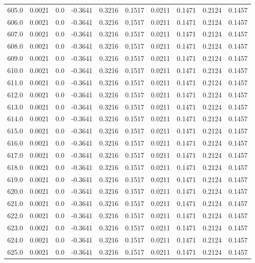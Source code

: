 \begin{longtable}{lrrrrrrrrr}
605.0 & 0.0021 & 0.0 & -0.3641 & 0.3216 & 0.1517 & 0.0211 & 0.1471 & 0.2124 & 0.1457 \\
606.0 & 0.0021 & 0.0 & -0.3641 & 0.3216 & 0.1517 & 0.0211 & 0.1471 & 0.2124 & 0.1457 \\
607.0 & 0.0021 & 0.0 & -0.3641 & 0.3216 & 0.1517 & 0.0211 & 0.1471 & 0.2124 & 0.1457 \\
608.0 & 0.0021 & 0.0 & -0.3641 & 0.3216 & 0.1517 & 0.0211 & 0.1471 & 0.2124 & 0.1457 \\
609.0 & 0.0021 & 0.0 & -0.3641 & 0.3216 & 0.1517 & 0.0211 & 0.1471 & 0.2124 & 0.1457 \\
610.0 & 0.0021 & 0.0 & -0.3641 & 0.3216 & 0.1517 & 0.0211 & 0.1471 & 0.2124 & 0.1457 \\
611.0 & 0.0021 & 0.0 & -0.3641 & 0.3216 & 0.1517 & 0.0211 & 0.1471 & 0.2124 & 0.1457 \\
612.0 & 0.0021 & 0.0 & -0.3641 & 0.3216 & 0.1517 & 0.0211 & 0.1471 & 0.2124 & 0.1457 \\
613.0 & 0.0021 & 0.0 & -0.3641 & 0.3216 & 0.1517 & 0.0211 & 0.1471 & 0.2124 & 0.1457 \\
614.0 & 0.0021 & 0.0 & -0.3641 & 0.3216 & 0.1517 & 0.0211 & 0.1471 & 0.2124 & 0.1457 \\
615.0 & 0.0021 & 0.0 & -0.3641 & 0.3216 & 0.1517 & 0.0211 & 0.1471 & 0.2124 & 0.1457 \\
616.0 & 0.0021 & 0.0 & -0.3641 & 0.3216 & 0.1517 & 0.0211 & 0.1471 & 0.2124 & 0.1457 \\
617.0 & 0.0021 & 0.0 & -0.3641 & 0.3216 & 0.1517 & 0.0211 & 0.1471 & 0.2124 & 0.1457 \\
618.0 & 0.0021 & 0.0 & -0.3641 & 0.3216 & 0.1517 & 0.0211 & 0.1471 & 0.2124 & 0.1457 \\
619.0 & 0.0021 & 0.0 & -0.3641 & 0.3216 & 0.1517 & 0.0211 & 0.1471 & 0.2124 & 0.1457 \\
620.0 & 0.0021 & 0.0 & -0.3641 & 0.3216 & 0.1517 & 0.0211 & 0.1471 & 0.2124 & 0.1457 \\
621.0 & 0.0021 & 0.0 & -0.3641 & 0.3216 & 0.1517 & 0.0211 & 0.1471 & 0.2124 & 0.1457 \\
622.0 & 0.0021 & 0.0 & -0.3641 & 0.3216 & 0.1517 & 0.0211 & 0.1471 & 0.2124 & 0.1457 \\
623.0 & 0.0021 & 0.0 & -0.3641 & 0.3216 & 0.1517 & 0.0211 & 0.1471 & 0.2124 & 0.1457 \\
624.0 & 0.0021 & 0.0 & -0.3641 & 0.3216 & 0.1517 & 0.0211 & 0.1471 & 0.2124 & 0.1457 \\
625.0 & 0.0021 & 0.0 & -0.3641 & 0.3216 & 0.1517 & 0.0211 & 0.1471 & 0.2124 & 0.1457 \\

\end{longtable}
